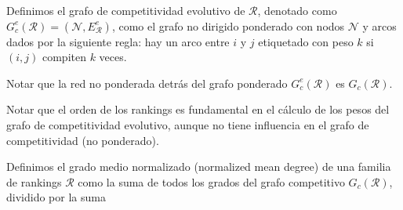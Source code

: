 \documentclass[10pt,a4paper]{article}
\begin{document}
\begin{defi}
Definimos el grafo de competitividad evolutivo de $\mathcal{R}$, denotado como $G_c^e(\mathcal{R}) = (\mathcal{N}, E_\mathcal{R}^e)$, como el grafo no dirigido ponderado con nodos $\mathcal{N}$ y arcos dados por la siguiente regla: hay un arco entre $i$ y $j$ etiquetado con peso $k$ si $(i,j)$ compiten $k$ veces.  
\end{defi}

\begin{nota}
Notar que la red no ponderada detrás del grafo ponderado $G_c^e(\mathcal{R})$ es $G_c(\mathcal{R})$.
\end{nota}

\begin{nota}
Notar que el orden de los rankings es fundamental en el cálculo de los pesos del grafo de competitividad evolutivo, aunque no tiene influencia en el grafo de competitividad (no ponderado). 
\end{nota}

\begin{defi}
Definimos el grado medio normalizado (normalized mean degree) de una familia de rankings $\mathcal{R}$ como la suma de todos los grados del grafo competitivo $G_c(\mathcal{R})$, dividido por la suma 
\end{defi}
\end{document}
